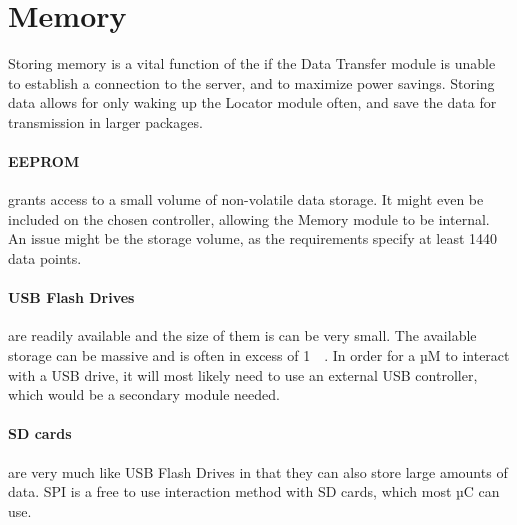 \section{Memory}
Storing memory is a vital function of the \systemName if the Data Transfer module is unable to establish a connection to the server, and to maximize power savings.
Storing data allows for only waking up the Locator module often, and save the data for transmission in larger packages.
\paragraph{EEPROM} grants access to a small volume of non-volatile data storage.
It might even be included on the chosen controller, allowing the Memory module to be internal.
An issue might be the storage volume, as the requirements specify at least \num{1440} data points.

\paragraph{USB Flash Drives} are readily available and the size of them is can be very small.
The available storage can be massive and is often in excess of \SI{1}{\giga\byte}. In order for a µM to interact with a USB drive, it will most likely need to use an external USB controller, which would be a secondary module needed.

\paragraph{SD cards} are very much like USB Flash Drives in that they can also store large amounts of data. SPI is a free to use interaction method with SD cards, which most µC can use.

\FloatBarrier
